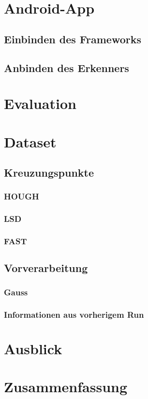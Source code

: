 
\chapter{Android-App}
	\section{Einbinden des Frameworks}
	\section{Anbinden des Erkenners}
\chapter{Evaluation}
	\chapter{Dataset}
	\section{Kreuzungspunkte}
		\subsection{HOUGH}
		\subsection{LSD}
		\subsection{FAST}
	\section{Vorverarbeitung}
		\subsection{Gauss}
		\subsection{Informationen aus vorherigem Run}
\chapter{Ausblick}
\chapter{Zusammenfassung}
